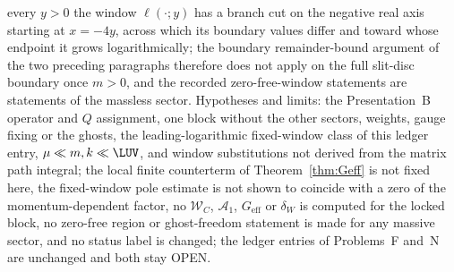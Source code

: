 every \(y>0\) the window \(\ell(\cdot;y)\) has a branch cut on the
negative real axis starting at \(x=-4y\), across which its boundary
values differ and toward whose endpoint it grows logarithmically;
the boundary remainder-bound argument of the two preceding paragraphs
therefore does not apply on the full slit-disc boundary once
\(m>0\), and the recorded zero-free-window statements are statements
of the massless sector. Hypotheses and limits: the Presentation~B
operator and \(Q\) assignment, one block without the other sectors,
weights, gauge fixing or the ghosts, the leading-logarithmic
fixed-window class of this ledger entry, \(\mu\ll m,k\ll\LUV\), and
window substitutions not derived from the matrix path integral; the
local finite counterterm of Theorem~\ref{thm:Geff} is not fixed here,
the fixed-window pole estimate is not shown to coincide with a zero
of the momentum-dependent factor, no \(\mathcal W_C\),
\(\mathcal A_1\), \(G_{\mathrm{eff}}\) or \(\delta_W\) is computed
for the locked block, no zero-free region or ghost-freedom statement
is made for any massive sector, and no status label is changed; the
ledger entries of Problems~F and~N are unchanged and both stay OPEN.
